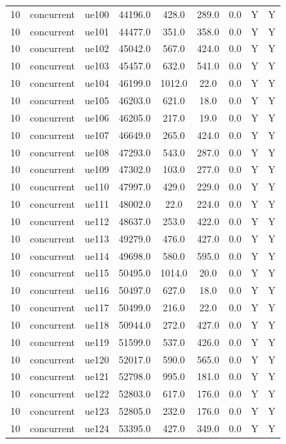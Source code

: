 \begin{table}[ht]
\begin{tabular}{|c|c|c|c|c|c|c|c|c|}
10 & concurrent & ue100 & 44196.0 & 428.0 & 289.0 & 0.0 & Y & Y \\
10 & concurrent & ue101 & 44477.0 & 351.0 & 358.0 & 0.0 & Y & Y \\
10 & concurrent & ue102 & 45042.0 & 567.0 & 424.0 & 0.0 & Y & Y \\
10 & concurrent & ue103 & 45457.0 & 632.0 & 541.0 & 0.0 & Y & Y \\
10 & concurrent & ue104 & 46199.0 & 1012.0 & 22.0 & 0.0 & Y & Y \\
10 & concurrent & ue105 & 46203.0 & 621.0 & 18.0 & 0.0 & Y & Y \\
10 & concurrent & ue106 & 46205.0 & 217.0 & 19.0 & 0.0 & Y & Y \\
10 & concurrent & ue107 & 46649.0 & 265.0 & 424.0 & 0.0 & Y & Y \\
10 & concurrent & ue108 & 47293.0 & 543.0 & 287.0 & 0.0 & Y & Y \\
10 & concurrent & ue109 & 47302.0 & 103.0 & 277.0 & 0.0 & Y & Y \\
10 & concurrent & ue110 & 47997.0 & 429.0 & 229.0 & 0.0 & Y & Y \\
10 & concurrent & ue111 & 48002.0 & 22.0 & 224.0 & 0.0 & Y & Y \\
10 & concurrent & ue112 & 48637.0 & 253.0 & 422.0 & 0.0 & Y & Y \\
10 & concurrent & ue113 & 49279.0 & 476.0 & 427.0 & 0.0 & Y & Y \\
10 & concurrent & ue114 & 49698.0 & 580.0 & 595.0 & 0.0 & Y & Y \\
10 & concurrent & ue115 & 50495.0 & 1014.0 & 20.0 & 0.0 & Y & Y \\
10 & concurrent & ue116 & 50497.0 & 627.0 & 18.0 & 0.0 & Y & Y \\
10 & concurrent & ue117 & 50499.0 & 216.0 & 22.0 & 0.0 & Y & Y \\
10 & concurrent & ue118 & 50944.0 & 272.0 & 427.0 & 0.0 & Y & Y \\
10 & concurrent & ue119 & 51599.0 & 537.0 & 426.0 & 0.0 & Y & Y \\
10 & concurrent & ue120 & 52017.0 & 590.0 & 565.0 & 0.0 & Y & Y \\
10 & concurrent & ue121 & 52798.0 & 995.0 & 181.0 & 0.0 & Y & Y \\
10 & concurrent & ue122 & 52803.0 & 617.0 & 176.0 & 0.0 & Y & Y \\
10 & concurrent & ue123 & 52805.0 & 232.0 & 176.0 & 0.0 & Y & Y \\
10 & concurrent & ue124 & 53395.0 & 427.0 & 349.0 & 0.0 & Y & Y \\

\end{tabular}
\end{table}
